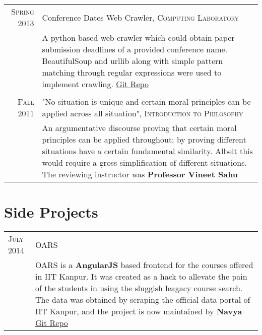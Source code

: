 \documentclass[a4paper,10pt]{article} %
\begin{document}
\begin{tabular}{r|p{11cm}}
    \textsc{Spring 2013} & Conference Dates Web Crawler, \textsc{Computing Laboratory} \\
                         & \footnotesize{A python based web crawler which could obtain paper submission
                            deadlines of a provided conference name.  BeautifulSoup and urllib along
                            with simple pattern matching through regular expressions were used to implement crawling.
                            \href{https://github.com/srijanshetty/crawler} {Git Repo} } \\
                            \\

    \textsc{Fall 2011} & "No situation is unique and certain moral principles can be applied across all situation",
                         \textsc{Introduction to Philosophy} \\
                       & \footnotesize{ An argumentative discourse proving that certain moral principles
                         can be applied throughout; by proving different situations have a certain
                         fundamental similarity.  Albeit this would require a gross simplification of
                         different situations.  The reviewing instructor was \textbf{Professor Vineet Sahu}} \\

\end{tabular}

\section{Side Projects}

\begin{tabular}{p{2.2cm}|p{11cm}}
    \textsc{July 2014} & OARS\\
                       & \footnotesize{OARS is a \textbf{AngularJS} based frontend for the
                          courses offered in IIT Kanpur. It was created as a
                          hack to allevate the pain of the students in using the
                          sluggish leagacy course search. The data was obtained by
                          scraping the official data portal of IIT Kanpur, and the
                          project is now maintained by \textbf{Navya}
                          \href{https://github.com/navya/oars} {Git Repo} }\\

\end{tabular}
\end{document}
